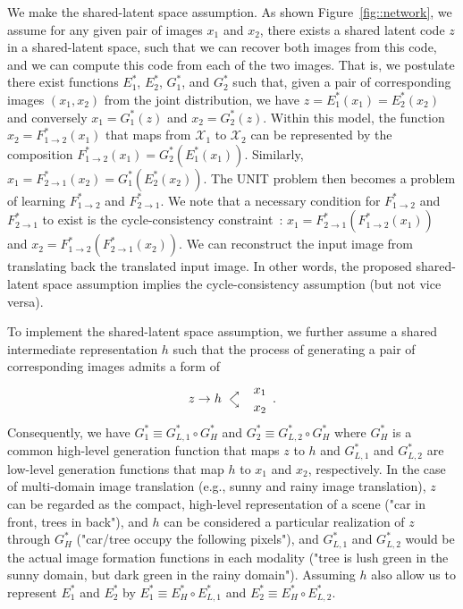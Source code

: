 \documentclass{article}
\newcommand*{\bfrac}[2]{\genfrac{}{}{0pt}{}{#1}{#2}}
\begin{document}
We make the shared-latent space assumption. As shown Figure~\ref{fig::network}, we assume for any given pair of images $x_1$ and $x_2$, there exists a shared latent code $z$ in a shared-latent space, such that we can recover both images from this code, and we can compute this code from each of the two images. That is, we postulate there exist functions $E_1^*$, $E_2^*$, $G_1^*$, and $G_2^*$ such that, given a pair of corresponding images $(x_1, x_2)$ from the joint distribution, we have $z = E_1^*(x_1) = E_2^*(x_2)$ and conversely $x_1 = G_1^*(z)$ and $x_2 = G_2^*(z)$. Within this model, the function $x_2 = F_{1\rightarrow 2}^{*}(x_1)$ that maps from $\mathcal{X}_1$ to $\mathcal{X}_2$ can be represented by the composition $F_{1\rightarrow 2}^{*}(x_1) = G_2^*(E_1^*(x_1))$. Similarly, $x_1 = F_{2\rightarrow 1}^{*}(x_2) = G_1^*(E_2^*(x_2))$. The UNIT problem then becomes a problem of learning $F_{1\rightarrow 2}^{*}$ and $F_{2\rightarrow 1}^{*}$. We note that a necessary condition for $F_{1\rightarrow 2}^{*}$ and $F_{2\rightarrow 1}^{*}$ to exist is the cycle-consistency constraint~\cite{zhu2017unpaired,kim2017learning}: $x_1 =  F_{2\rightarrow 1}^{*}(F_{1\rightarrow 2}^{*}(x_1))$ and $x_2=F_{1\rightarrow 2}^{*}(F_{2\rightarrow 1}^{*}(x_2))$. We can reconstruct the input image from translating back the translated input image. In other words, the proposed shared-latent space assumption implies the cycle-consistency assumption (but not vice versa).


To implement the shared-latent space assumption, we further assume a shared intermediate representation $h$ such that the process of generating a pair of corresponding images admits a form of 
\begin{equation}
z \rightarrow h \begin{array}{cc} \bfrac{}{\nearrow} & x_1 \\ \bfrac{\searrow}{} & x_2 \end{array}.
\end{equation}
Consequently, we have $G_1^* \equiv G_{L,1}^* \circ G_{H}^*$ and $G_2^* \equiv G_{L,2}^* \circ G_{H}^* $ where $G_{H}^*$ is a common high-level generation function that maps $z$ to $h$ and $G_{L,1}^*$ and $G_{L,2}^*$ are low-level generation functions that map $h$ to $x_1$ and $x_2$, respectively. In the case of multi-domain image translation (e.g., sunny and rainy image translation), $z$ can be regarded as the compact, high-level representation of a scene ("car in front, trees in back"), and $h$ can be considered a particular realization of $z$ through $G_H^*$ ("car/tree occupy the following pixels"), and $G_{L,1}^*$ and $G_{L,2}^*$ would be the actual image formation functions in each modality ("tree is lush green in the sunny domain, but dark green in the rainy domain"). Assuming $h$ also allow us to represent $E_1^*$ and $E_2^*$ by $E_1^* \equiv E_{H}^* \circ E_{L,1}^*$ and $E_2^* \equiv E^{*}_{H} \circ E_{L,2}^*$. 
\end{document}
